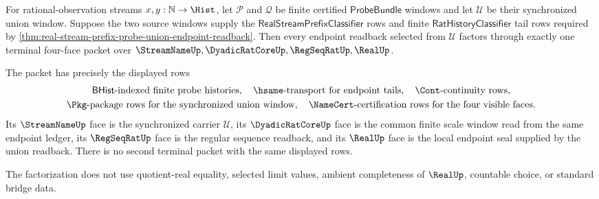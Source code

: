 \begin{theorem}
\label{thm:real-stream-prefix-probe-union-terminal-four-face-factorization}
For rational-observation streams $x,y:\mathbb{N}\to\Hist$, let
$\mathcal P$ and $\mathcal Q$ be finite certified $\mathsf{ProbeBundle}$
windows and let $\mathcal U$ be their synchronized union window. Suppose the
two source windows supply the $\mathsf{RealStreamPrefixClassifier}$ rows and
finite $\mathsf{RatHistoryClassifier}$ tail rows required by
\autoref{thm:real-stream-prefix-probe-union-endpoint-readback}. Then every
endpoint readback selected from $\mathcal U$ factors through exactly one
terminal four-face packet over
$\StreamNameUp,\DyadicRatCoreUp,\RegSeqRatUp,\RealUp$.

The packet has precisely the displayed rows
$$
\begin{gathered}
\mathsf{BHist}\text{-indexed finite probe histories},\quad
\hsame\text{-transport for endpoint tails},\quad
\Cont\text{-continuity rows},\\
\Pkg\text{-package rows for the synchronized union window},\quad
\NameCert\text{-certification rows for the four visible faces}.
\end{gathered}
$$
Its $\StreamNameUp$ face is the synchronized carrier $\mathcal U$, its
$\DyadicRatCoreUp$ face is the common finite scale window read from the same
endpoint ledger, its $\RegSeqRatUp$ face is the regular sequence readback, and
its $\RealUp$ face is the local endpoint seal supplied by the union readback.
There is no second terminal packet with the same displayed rows.

The factorization does not use quotient-real equality, selected limit values,
ambient completeness of $\RealUp$, countable choice, or standard bridge data.
\end{theorem}
